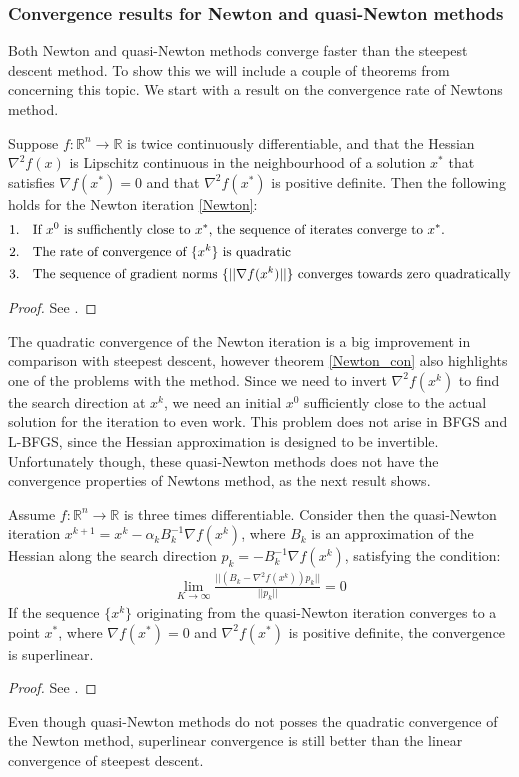 \subsubsection{Convergence results for Newton and quasi-Newton methods}
Both Newton and quasi-Newton methods converge faster than the steepest descent method. To show this we will include a couple of theorems from \cite{nocedal2006numerical}
concerning this topic. We start with a result on the convergence rate of Newtons method.
\begin{theorem}
\label{Newton_con}
Suppose $f:\mathbb{R}^n\rightarrow\mathbb{R}$ is twice continuously differentiable, and that the Hessian $\nabla^2 f(x)$ is Lipschitz continuous in the neighbourhood of a solution $x^*$ that satisfies $\nabla f(x^*)=0$ and that $\nabla^2 f(x^*)$ is positive definite. Then the following holds for the Newton iteration \ref{Newton}:
\begin{align*}
1.\quad&\textrm{If $x^0$ is suffichently close to $x^*$, the sequence of iterates converge to $x^*$.}\\
2.\quad&\textrm{The rate of convergence of $\{x^k\}$ is quadratic}\\
3.\quad&\textrm{The sequence of gradient norms $ \{||\nabla f(x^k)||\}$ converges towards zero quadratically}
\end{align*}
\end{theorem}
\begin{proof}
See \cite{nocedal2006numerical}.
\end{proof}
\noindent
The quadratic convergence of the Newton iteration is a big improvement in comparison with steepest descent, however theorem \ref{Newton_con} also highlights one of the problems with the method. Since we need to invert $\nabla^2 f(x^k)$ to find the search direction at $x^k$, we need an initial $x^0$ sufficiently close to the actual solution for the iteration to even work. This problem does not arise in BFGS and L-BFGS, since the Hessian approximation is designed to be invertible. Unfortunately though, these quasi-Newton methods does not have the convergence properties of Newtons method, as the next result shows.
\begin{theorem}
Assume $f:\mathbb{R}^n\rightarrow\mathbb{R}$ is three times differentiable. Consider then the quasi-Newton iteration $x^{k+1}=x^k-\alpha_k B_k^{-1}\nabla f(x^k)$, where $B_k$ is an approximation of the Hessian along the search direction $p_k=-B_k^{-1}\nabla f(x^k)$, satisfying the condition:
\begin{align*}
\lim_{K\rightarrow\infty}\frac{||(B_k-\nabla^2f(x^k))p_k||}{||p_k||}=0
\end{align*}
If the sequence $\{x^k\}$ originating from the quasi-Newton iteration converges to a point $x^*$, where $\nabla f(x^*)=0$ and $\nabla^2 f(x^*)$ is positive definite, the convergence is superlinear. 
\end{theorem} 
\begin{proof}
See \cite{nocedal2006numerical}.
\end{proof}
\noindent
Even though quasi-Newton methods do not posses the quadratic convergence of the Newton method, superlinear convergence is still better than the linear convergence of steepest descent.